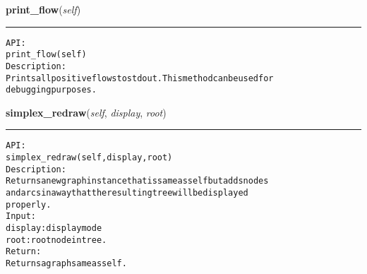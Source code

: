     \label{coinor:gimpy:graph:Graph:print_flow}

    \vspace{0.5ex}

\hspace{.8\funcindent}\begin{boxedminipage}{\funcwidth}

    \raggedright \textbf{print\_flow}(\textit{self})

    \vspace{-1.5ex}

    \rule{\textwidth}{0.5\fboxrule}
\setlength{\parskip}{2ex}
\begin{alltt}

API:
    print\_flow(self)
Description:
    Prints all positive flows to stdout. This method can be used for
    debugging purposes.
\end{alltt}

\setlength{\parskip}{1ex}
    \end{boxedminipage}

    \label{coinor:gimpy:graph:Graph:simplex_redraw}

    \vspace{0.5ex}

\hspace{.8\funcindent}\begin{boxedminipage}{\funcwidth}

    \raggedright \textbf{simplex\_redraw}(\textit{self}, \textit{display}, \textit{root})

    \vspace{-1.5ex}

    \rule{\textwidth}{0.5\fboxrule}
\setlength{\parskip}{2ex}
\begin{alltt}

API:
    simplex\_redraw(self, display, root)
Description:
    Returns a new graph instance that is same as self but adds nodes
    and arcs in a way that the resulting tree will be displayed
    properly.
Input:
    display: display mode
    root: root node in tree.
Return:
    Returns a graph same as self.
\end{alltt}

\setlength{\parskip}{1ex}
    \end{boxedminipage}

